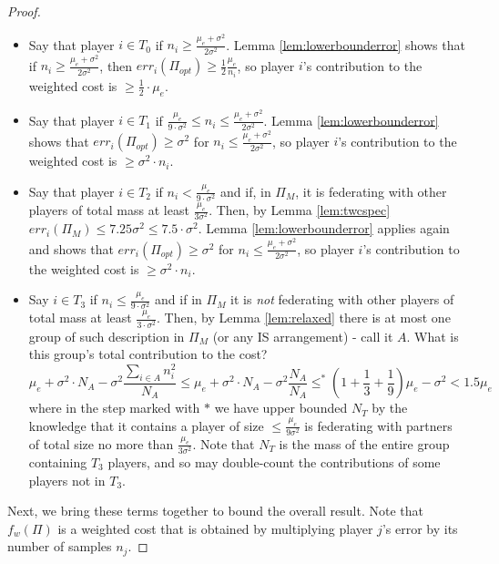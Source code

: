 \documentclass{article}
\newcommand{\p}[1]{\left( #1 \right)}
\newcommand{\cd}[0]{\cdot}
\newcommand{\mue}[0]{\ensuremath{\mu_e}}
\newcommand{\var}[0]{\ensuremath{\sigma^2}}
\newcommand{\ndraw}[0]{\ensuremath{n}}
\newcommand{\total}[0]{\ensuremath{N}}
\newcommand{\costw}[0]{\ensuremath{f_w}}
\newcommand{\partition}[0]{\ensuremath{\Pi}}
\begin{document}
\begin{proof}
\begin{itemize}
    \item Say that player $i \in T_0$ if $\ndraw_i \geq \frac{\mue+\var}{2\var}$. Lemma \ref{lem:lowerbounderror} shows that if $\ndraw_i \geq \frac{\mue + \var}{2\var}$, then $err_i(\partition_{opt}) \geq \frac{1}{2} \frac{\mue}{\ndraw_i}$, so player $i$'s contribution to the weighted cost is  $ \geq \frac{1}{2} \cd \mue$. 
    \item Say that player $i \in T_1$ if  $\frac{\mue}{9\cd \var} \leq \ndraw_i \leq \frac{\mue+\var}{2\var}$. Lemma \ref{lem:lowerbounderror} shows that $err_i(\partition_{opt}) \geq \var $ for $\ndraw_i \leq \frac{\mue + \var}{2\var}$, so player $i$'s contribution to the weighted cost is  $ \geq \var \cd \ndraw_i$.
    \item Say that player $i \in T_2$ if $\ndraw_i < \frac{\mue}{9 \cd \var}$ and if, in $\partition_M$, it is federating with other players of total mass at least $\frac{\mue}{3 \var}$. Then, by Lemma \ref{lem:twcspec} $err_i(\partition_{M}) \leq 7.25 \var \leq 7.5 \cd \var$. Lemma \ref{lem:lowerbounderror} applies again and shows that $err_i(\partition_{opt}) \geq \var $ for $\ndraw_i \leq \frac{\mue + \var}{2\var}$, so player $i$'s contribution to the weighted cost is  $ \geq \var \cd \ndraw_i$.
    \item Say $i \in T_3$ if $\ndraw_i \leq \frac{\mue}{9 \cd \var}$ and if in $\partition_{M}$ it is \emph{not} federating with other players of total mass at least $\frac{\mue}{3\cd \var}$. Then, by Lemma \ref{lem:relaxed} there is at most one group of such description in $\partition_M$ (or any IS arrangement) - call it $A$. What is this group's total contribution to the cost? 
    $$\mue + \var \cd \total_{A} - \var \frac{\sum_{i \in A} \ndraw_i^2}{\total_{A}} \leq \mue + \var \cd \total_{A} - \var \frac{\total_A}{\total_{A}} \leq^* \p{1 + \frac{1}{3} + \frac{1}{9}}\mue - \var < 1.5\mue$$
    where in the step marked with $*$ we have upper bounded $\total_T$ by the knowledge that it contains a player of size $\leq \frac{\mue}{9\var}$ is federating with partners of total size no more than $\frac{\mue}{3\var}$. Note that $\total_T$ is the mass of the entire group containing $T_3$ players, and so may double-count the contributions of some players not in $T_3$. 
\end{itemize}
Next, we bring these terms together to bound the overall result. Note that $\costw(\partition)$ is a weighted cost that is obtained by multiplying player $j$'s error by its number of samples $\ndraw_j$. 

\end{proof}
\end{document}
